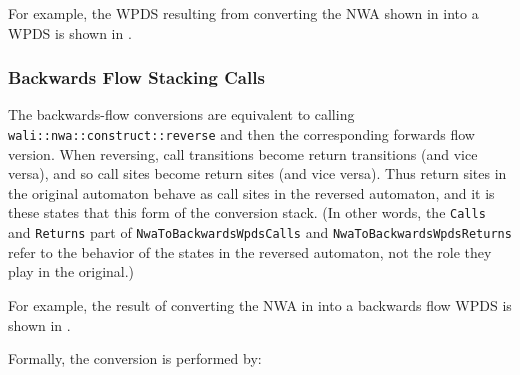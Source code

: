 For example, the WPDS resulting from converting the NWA
shown in  into a WPDS is shown in
. \\


\subsubsection{Backwards Flow Stacking Calls}

The backwards-flow conversions are equivalent to calling
\texttt{wali::\-nwa::\-construct::\-reverse} and then the corresponding forwards
flow version. When reversing, call transitions become return transitions (and
vice versa), and so call sites become return sites (and vice versa). Thus
return sites in the original automaton behave as call sites in the reversed
automaton, and it is these states that this form of the conversion stack. (In
other words, the \texttt{Calls} and \texttt{Returns} part of
\texttt{NwaTo\-Backwards\-WpdsCalls} and
\texttt{NwaTo\-Backwards\-WpdsReturns} refer to the behavior of the states in
the reversed automaton, not the role they play in the original.)

For example, the result of converting the NWA in
 into a backwards flow WPDS is shown in .


Formally, the conversion is performed by:


